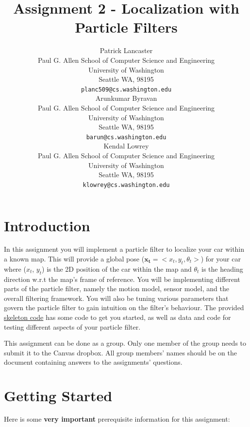 \documentclass[final]{article}
\title{Assignment 2 - Localization with Particle Filters}
\author{
  Patrick Lancaster\\
  Paul G. Allen School of Computer Science and Engineering\\  
  University of Washington\\
  Seattle WA, 98195 \\
  \texttt{planc509@cs.washington.edu} \\
  \And
  Arunkumar Byravan\\
  Paul G. Allen School of Computer Science and Engineering\\
  University of Washington\\
  Seattle WA, 98195 \\
  \texttt{barun@cs.washington.edu} \\ 
  \And
  Kendal Lowrey\\
  Paul G. Allen School of Computer Science and Engineering\\
  University of Washington\\
  Seattle WA, 98195 \\
  \texttt{klowrey@cs.washington.edu} \\    
}
\begin{document}

\maketitle

\section{Introduction}

In this assignment you will implement a particle filter to localize your car within a known map. This will provide a global pose ($\mathbf{x_t} = <x_t, y_t, \theta_t>$) for your car where ($x_t$, $y_t$) is the 2D position of the car within the map and $\theta_t$ is the heading direction w.r.t the map's frame of reference. You will be implementing different parts of the particle filter, namely the motion model, sensor model, and the overall filtering framework. You will also be tuning various parameters that govern the particle filter to gain intuition on the filter's behaviour. The provided \href{https://gitlab.cs.washington.edu/uw_racecar/course_materials/lab2}{skeleton code} has some code to get you started, as well as data and code for testing different aspects of your particle filter. 

This assignment can be done as a group. Only one member of the group needs to submit it to the Canvas dropbox. All group members' names should be on the document containing answers to the assignments' questions.

\section{Getting Started}

Here is some \textbf{very important} prerequisite information for this assignment:
\end{document}

